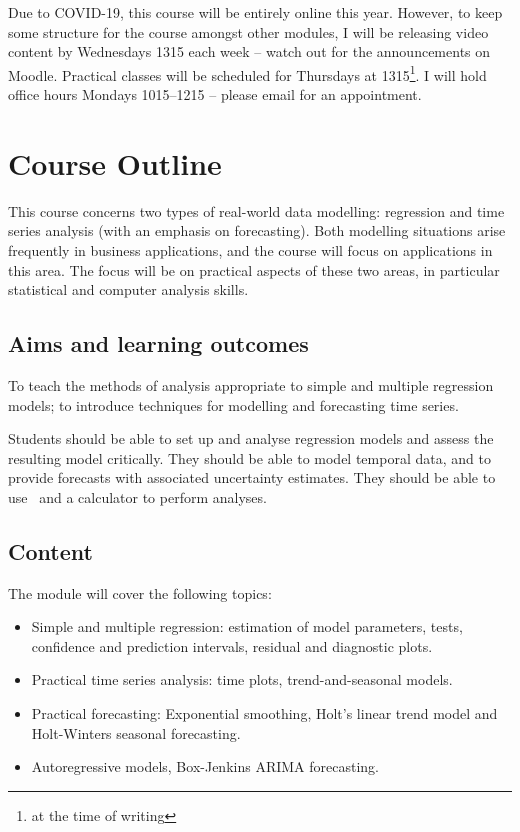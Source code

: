\documentclass[12pt,a4paper,openany,twoside]{report}
\theoremstyle{definition}
\theoremstyle{remark}
\theoremstyle{plain}
\newcommand{\sR}[1]{\textbf{R}\,}
\theoremstyle{definition}
\theoremstyle{definition}
\theoremstyle{definition}
\theoremstyle{remark}
\begin{document}
Due to COVID-19, this course will be entirely online this year. However, to keep some structure for the course amongst other modules, I will be releasing video content by Wednesdays 1315 each
week -- watch out for the announcements on Moodle. Practical classes will be scheduled for Thursdays at 1315\footnote{at the time of writing}. I will hold office hours Mondays 1015--1215 -- please email for an appointment.

\hypertarget{course-outline}{%
\section*{Course Outline}\label{course-outline}}

This course concerns two types of real-world data modelling: regression and time series analysis (with an emphasis on forecasting). Both modelling situations arise
frequently in business applications, and the course will focus on applications in this area. The focus will be on practical aspects of these two areas, in particular statistical and computer analysis skills.

\hypertarget{aims-and-learning-outcomes}{%
\subsection*{Aims and learning outcomes}\label{aims-and-learning-outcomes}}

To teach the methods of analysis appropriate to simple and multiple regression models; to introduce techniques for modelling and forecasting time series.

Students should be able to set up and analyse regression models and assess the resulting model critically. They should be able to model temporal data, and to provide forecasts with associated uncertainty estimates. They should be able to use \sR~and a calculator to perform analyses.

\hypertarget{content}{%
\subsection*{Content}\label{content}}

The module will cover the following topics:

\begin{itemize}
\item
  Simple and multiple regression: estimation of model parameters, tests, confidence and prediction intervals, residual and diagnostic plots.
\item
  Practical time series analysis: time plots, trend-and-seasonal models.
\item
  Practical forecasting: Exponential smoothing, Holt's linear trend model and Holt-Winters seasonal forecasting.
\item
  Autoregressive models, Box-Jenkins ARIMA forecasting.
\end{itemize}
\end{document}
